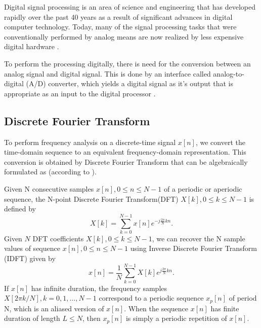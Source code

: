 \documentclass[twoside]{ctuthesis}
\theoremstyle{plain}
\theoremstyle{definition}
\theoremstyle{note}
\begin{document}
	Digital signal processing is an area of science and engineering that has developed rapidly over the past 40 years as a result of significant advances in digital computer technology. Today, many of the signal processing tasks that were conventionally performed by analog means are now realized by less expensive digital hardware \cite{cite:2}.
	
	To perform the processing digitally, there is need for the conversion between an analog signal and digital signal. This is done by an interface called analog-to-digital (A/D) converter, which yields a digital signal as it's output that is appropriate as an input to the digital processor \cite{cite:2,cite:3}.
	
\subsection{Discrete Fourier Transform}
To perform frequency analysis on a discrete-time signal ${x[n]}$, we convert the time-domain sequence to an equivalent frequency-domain representation. This conversion is obtained by Discrete Fourier Transform that can be algebraically formulated as (according to \cite{cite:2,cite:3}).
	
Given N consecutive samples $x[n], 0 \leq n \leq N-1$ of a periodic or aperiodic sequence, the N-point Discrete Fourier Transform(DFT) $X[k], 0 \leq k \leq N-1$ is defined by
\begin{equation} \label{eq:DFT}
X[k]=\sum_{k=0}^{N-1}x[n]e^{-j \frac{2 \pi}{N} kn}.
\end{equation}
Given $N$ DFT coefficients $X[k], 0 \leq k \leq N-1$, we can recover the N sample values of sequence $x[n], 0 \leq n \leq N-1$ using Inverse Discrete Fourier Transform (IDFT) given by
\begin{equation} \label{eq:IDFT}
x[n]=\frac{1}{N} \sum_{k=0}^{N-1}X[k]e^{j \frac{2 \pi}{N} kn}.
\end{equation}
If $x[n]$ has infinite duration, the frequency samples  $X[2 \pi k/ N], k=0, 1, ..., N-1$ correspond to a periodic sequence $x_{p}[n]$ of period N, which is an aliased version of $x[n]$. When the sequence $x[n]$ has finite duration of length $L \leq N$, then  $x_{p}[n]$ is simply a periodic repetition of $x[n]$.
\end{document}
